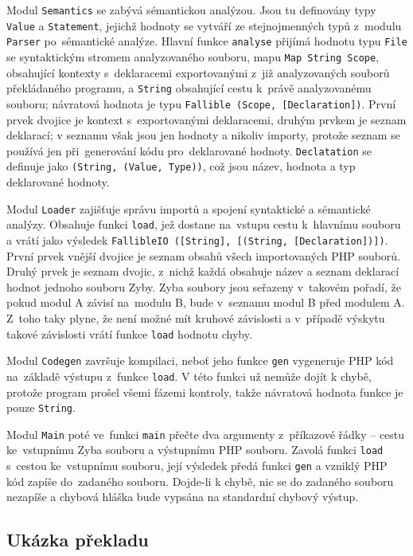 \documentclass[a4paper,12pt]{article}
\begin{document}
Modul \texttt{Semantics} se zabývá sémantickou analýzou. Jsou tu definovány typy \texttt{Value} a \texttt{Statement}, jejichž hodnoty se vytváří ze stejnojmenných typů z~modulu \texttt{Parser} po~sémantické analýze. Hlavní funkce \texttt{analyse} přijímá hodnotu typu \texttt{File} se syntaktickým stromem analyzovaného souboru, mapu \texttt{Map String Scope}, obsahující kontexty s~deklaracemi exportovanými z~již analyzovaných souborů překládaného programu, a \texttt{String} obsahující cestu k~právě analyzovanému souboru; návratová hodnota je typu \texttt{Fallible (Scope, [Declaration])}. První prvek dvojice je kontext s~exportovanými deklaracemi, druhým prvkem je seznam deklarací; v seznamu však jsou jen hodnoty a nikoliv importy, protože seznam se používá jen při~generování kódu pro~deklarované hodnoty. \texttt{Declatation} se definuje jako \texttt{(String, (Value, Type))}, což jsou název, hodnota a typ deklarované hodnoty.

Modul \texttt{Loader} zajišťuje správu importů a spojení syntaktické a sémantické analýzy. Obsahuje funkci \texttt{load}, jež dostane na~vstupu cestu k~hlavnímu souboru a vrátí jako výsledek \texttt{FallibleIO ([String], [(String, [Declaration])])}. První prvek vnější dvojice je seznam obsahů všech importovaných PHP souborů. Druhý prvek je seznam dvojic, z~nichž každá obsahuje název a seznam deklarací hodnot jednoho souboru Zyby. Zyba soubory jsou seřazeny v~takovém pořadí, že pokud modul A závisí na~modulu B, bude v~seznamu modul B před modulem A. Z~toho taky plyne, že není možné mít kruhové závislosti a v~případě výskytu takové závislosti vrátí funkce \texttt{load} hodnotu chyby.

Modul \texttt{Codegen} završuje kompilaci, neboť jeho funkce \texttt{gen} vygeneruje PHP kód na~základě výstupu z~funkce \texttt{load}. V této funkci už nemůže dojít k chybě, protože program prošel všemi fázemi kontroly, takže návratová hodnota funkce je pouze \texttt{String}.

Modul \texttt{Main} poté ve~funkci \texttt{main} přečte dva argumenty z~příkazové řádky -- cestu ke~vstupnímu Zyba souboru a výstupnímu PHP souboru. Zavolá funkci \texttt{load} s~cestou ke~vstupnímu souboru, její výsledek předá funkci \texttt{gen} a vzniklý PHP kód zapíše do~zadaného souboru. Dojde-li k chybě, nic se do zadaného souboru nezapíše a chybová hláška bude vypsána na standardní chybový výstup.

\subsection{Ukázka překladu}
\end{document}
